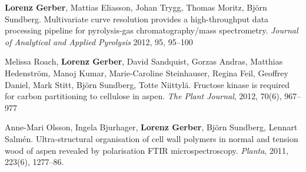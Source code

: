 \documentclass[10pt]{article}
\begin{document}
\begin{bibenum}
                                                                                           \item \textbf{Lorenz Gerber}, Mattias Eliasson, Johan Trygg,
                                                                                             Thomas Moritz, Bj\"{o}rn Sundberg. Multivariate curve
                                                                                             resolution provides a high-throughput data processing pipeline
                                                                                             for pyrolysis-gas chromatography/mass spectrometry.
                                                                                             \emph{Journal of Analytical and Applied Pyrolysis} 2012, 95, 95--100\\


                                                                                           \item Melissa Roach, \textbf{Lorenz Gerber}, David Sandquist,
                                                                                             Gorzas Andras, Matthias Hedenstr\"{o}m, Manoj Kumar,
                                                                                             Marie-Caroline Steinhauser, Regina Feil, Geoffrey Daniel,
                                                                                             Mark Stitt, Bj\"{o}rn Sundberg, Totte Niittyl\"{a}.
                                                                                             Fructose kinase is required for carbon partitioning to
                                                                                             cellulose in aspen. \emph{The Plant Journal}, 2012, 70(6), 967--977\\

                                                                                           \item Anne-Mari Olsson, Ingela Bjurhager, \textbf{Lorenz Gerber},
                                                                                             Bj\"{o}rn Sundberg, Lennart Salm\'{e}n. Ultra-structural
                                                                                             organisation of cell wall polymers in normal and tension wood
                                                                                             of aspen revealed by polarisation FTIR microspectroscopy.
                                                                                             \emph{Planta}, 2011, 223(6), 1277--86.\\


\end{bibenum}
\end{document}

